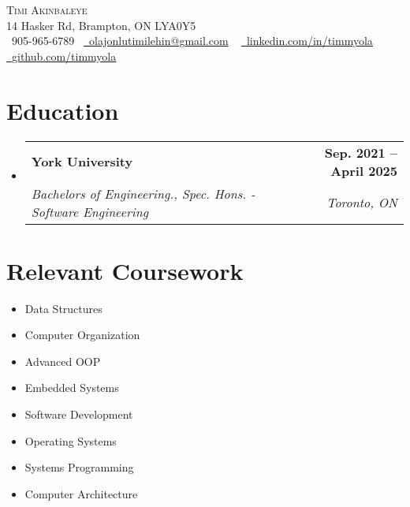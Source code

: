\documentclass[letterpaper,11pt]{article}
\makeatletter
\newcommand{\resumeSubheading}[4]{
  \vspace{-2pt}\item
    \begin{tabular*}{1.0\textwidth}[t]{l@{\extracolsep{\fill}}r}
      \textbf{#1} & \textbf{\small #2} \\
      \textit{\small#3} & \textit{\small #4} \\
    \end{tabular*}\vspace{-7pt}
}
\newcommand{\resumeSubHeadingListStart}{\begin{itemize}[leftmargin=0.0in, label={}]}
\newcommand{\resumeSubHeadingListEnd}{\end{itemize}}
\makeatother
\begin{document}

\begin{center}
    {\Huge \scshape Timi Akinbaleye} \\ \vspace{1pt}
    14 Hasker Rd, Brampton, ON LYA0Y5 \\ \vspace{1pt}
    \small \raisebox{-0.1\height}\faPhone\ 905-965-6789~ \href{mailto:olajonlutimilehin@gmail.com}{\raisebox{-0.2\height}\faEnvelope\  \underline{olajonlutimilehin@gmail.com}} ~ 
    \href{https://www.linkedin.com/in/timmyola/}{\raisebox{-0.2\height}\faLinkedin\ \underline{linkedin.com/in/timmyola}}  ~
    \href{https://github.com/timmyola}{\raisebox{-0.2\height}\faGithub\ \underline{github.com/timmyola}}
    \vspace{-8pt}
\end{center}


\section{Education}
  \resumeSubHeadingListStart
    \resumeSubheading
      {York University}{Sep. 2021 -- April 2025}
      {Bachelors of Engineering., Spec. Hons. - Software Engineering}{Toronto, ON}
  \resumeSubHeadingListEnd

\section{Relevant Coursework}
        \begin{multicols}{4}
            \begin{itemize}[itemsep=-5pt, parsep=3pt]
                \item\small Data Structures
                \item Computer Organization
                \item Advanced OOP
                \item Embedded Systems
                \item Software Development
                \item Operating Systems
                \item Systems Programming
                \item Computer Architecture
            \end{itemize}
        \end{multicols}
        \vspace*{2.0\multicolsep}
\end{document}
